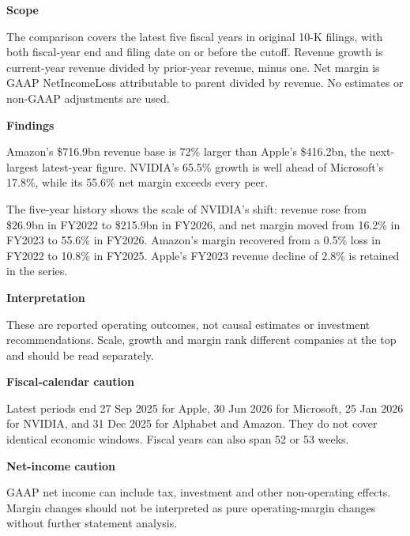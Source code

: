 \documentclass[a4paper,10pt]{article}
\begin{document}
\begin{minipage}[t]{0.57\textwidth}
\vspace{0pt}\raggedright
\setlength{\parskip}{4pt}
\textbf{Scope}\par
The comparison covers the latest five fiscal years in original 10-K filings, with both fiscal-year end and filing date on or before the cutoff. Revenue growth is current-year revenue divided by prior-year revenue, minus one. Net margin is GAAP NetIncomeLoss attributable to parent divided by revenue. No estimates or non-GAAP adjustments are used.

\textbf{Findings}\par
Amazon's \$716.9bn revenue base is 72\% larger than Apple's \$416.2bn, the next-largest latest-year figure. NVIDIA's 65.5\% growth is well ahead of Microsoft's 17.8\%, while its 55.6\% net margin exceeds every peer.

The five-year history shows the scale of NVIDIA's shift: revenue rose from \$26.9bn in FY2022 to \$215.9bn in FY2026, and net margin moved from 16.2\% in FY2023 to 55.6\% in FY2026. Amazon's margin recovered from a 0.5\% loss in FY2022 to 10.8\% in FY2025. Apple's FY2023 revenue decline of 2.8\% is retained in the series.

\textbf{Interpretation}\par
These are reported operating outcomes, not causal estimates or investment recommendations. Scale, growth and margin rank different companies at the top and should be read separately.
\end{minipage}\hfill
\begin{minipage}[t]{0.40\textwidth}
\vspace{0pt}\small


\textbf{Fiscal-calendar caution}\par
Latest periods end 27 Sep 2025 for Apple, 30 Jun 2026 for Microsoft, 25 Jan 2026 for NVIDIA, and 31 Dec 2025 for Alphabet and Amazon. They do not cover identical economic windows. Fiscal years can also span 52 or 53 weeks.

\textbf{Net-income caution}\par
GAAP net income can include tax, investment and other non-operating effects. Margin changes should not be interpreted as pure operating-margin changes without further statement analysis.
\end{minipage}
\par\medskip

\vfill
\end{document}
